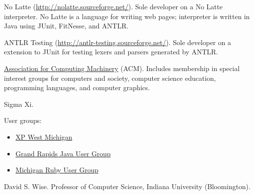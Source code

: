 \documentclass[ComputerScience]{vita}
\newcommand{\duphref}[1]{\href{#1}{#1}}
\begin{document}
\begin{vita}
\begin{software}
  \item No Latte (\duphref{http://nolatte.sourceforge.net/}).  Sole developer on a No Latte interpreter.  No Latte is a language for writing web pages; interpreter is written in Java using JUnit, FitNesse, and ANTLR.
  
  \item ANTLR Testing (\duphref{http://antlr-testing.sourceforge.net/}).  Sole developer on a extension to JUnit for testing lexers and parsers generated by ANTLR.

\end{software}

\begin{Memberships}

\item \href{http://www.acm.org/}{Association for Computing Machinery} (ACM).  Includes membership in special interest groups for computers and society, computer science education, programming languages, and computer graphics.


\item Sigma Xi.

\item User groups:
  \begin{itemize}
  \item \href{http://www.xpwestmichigan.org/}{XP West Michigan} 
  \item \href{http://www.gr-jug.org/}{Grand Rapids Java User Group}
  \item \href{http://gr-ruby.org/}{Michigan Ruby User Group}
  \end{itemize}

\end{Memberships}

\begin{References}

David S. Wise.  Professor of Computer Science, Indiana University (Bloomington).




\end{References}


\end{vita}
\end{document}
